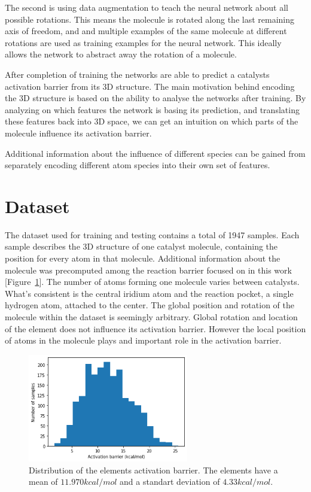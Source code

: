The second is using data augmentation to teach the neural network about all possible rotations.
This means the molecule is rotated along the last remaining axis of freedom, and and multiple examples of the same molecule at different rotations are used as training examples for the neural network.
This ideally allows the network to abstract away the rotation of a molecule.

After completion of training the networks are able to predict a catalysts activation barrier from its 3D structure.
The main motivation behind encoding the 3D structure is based on the ability to analyse the networks after training.
By analyzing on which features the network is basing its prediction, and translating these features back into 
3D space, we can get an intuition on which parts of the molecule influence its activation barrier.

Additional information about the influence of different species can be gained 
from separately encoding different atom species into their own set of features.

\section{Dataset}

The dataset used for training and testing contains a total of 1947 samples.
Each sample describes the 3D structure of one catalyst molecule, 
containing the position for every atom in that molecule.
Additional information about the molecule was precomputed among the reaction barrier focused on in this work [Figure~\ref{fig:barriers}].
The number of atoms forming one molecule varies between catalysts.
What's consistent is the central iridium atom and the reaction pocket, a single hydrogen atom, attached to the center.
The global position and rotation of the molecule within the dataset is seemingly arbitrary.
Global rotation and location of the element does not influence its activation barrier.
However the local position of atoms in the molecule plays and important role in the activation barrier.

\begin{figure}
  \centering
  \includegraphics[width=7cm]{figures/introduction/barrier.png}
  \caption[Distribution of activation barriers]{Distribution of the elements activation barrier. The elements have a mean of $11.970 kcal/mol$ and a standart deviation of $4.33 kcal/mol$.}
  \label{fig:barriers}
\end{figure}

